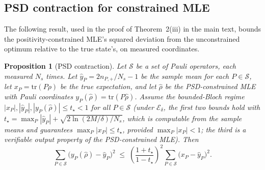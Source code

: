 \documentclass[twocolumn,prx,aps,superscriptaddress,longbibliography]{revtex4-2}
\newtheorem{proposition}{Proposition}
\newcommand{\pclaim}[4]{}
\begin{document}
\subsection{PSD contraction for constrained MLE}
\label{sec:psd-contraction}

The following result, used in the proof of
Theorem~2(iii) in the main text, bounds the
positivity-constrained MLE's squared deviation from the
unconstrained optimum relative to the true state's,
on measured coordinates.

\pclaim{env:prop:psd_contraction}{proved}{*}{prop:psd_contraction}%
\begin{proposition}[PSD contraction]
\label{prop:psd_contraction}
Let $\mathcal{S}$ be a set of Pauli operators, each measured $N_s$ times.
Let $\hat{y}_P = 2n_{P,+}/N_s - 1$ be the sample mean for
each $P \in \mathcal{S}$, let $x_P = \mathrm{tr}(P\rho)$ be the true
expectation, and let $\hat\rho$ be the PSD-constrained MLE
with Pauli coordinates $y_P(\hat\rho) = \mathrm{tr}(P\hat\rho)$.
Assume the bounded-Bloch regime
$|x_P|, |\hat{y}_P|, |y_P(\hat\rho)| \le t_\star < 1$ for all
$P \in \mathcal{S}$
(under $\mathcal{E}_\delta$, the first two bounds hold with
$t_\star = \max_P |\hat{y}_P| + \sqrt{2\ln(2M/\delta)/N_s}$,
which is computable from the sample means and guarantees
$\max_P |x_P| \le t_\star$, provided $\max_P |x_P| < 1$;
the third is a verifiable output property of the PSD-constrained MLE).
Then
\begin{equation}\label{eq:sm-psd-contraction}
  \sum_{P \in \mathcal{S}}
  \bigl(y_P(\hat\rho) - \hat{y}_P\bigr)^2
  \;\le\;
  \left(\frac{1+t_\star}{1-t_\star}\right)^{\!2}
  \sum_{P \in \mathcal{S}}
  \bigl(x_P - \hat{y}_P\bigr)^2.
\end{equation}
\end{proposition}
\end{document}
